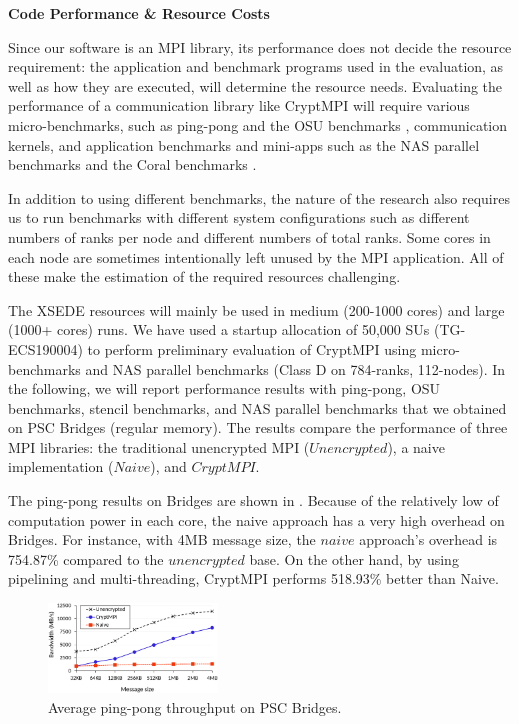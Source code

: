 \centerline{\Large\bfseries Code Performance \& Resource Costs}

Since our software is an MPI library, its performance does not decide the resource requirement:
the application and benchmark programs used in the evaluation, as well as how they are executed,
will determine the resource needs. Evaluating the performance of a communication library like
CryptMPI will require various micro-benchmarks, such as ping-pong and the OSU benchmarks \cite{OSUBM},
communication kernels, and application benchmarks and mini-apps such as the NAS parallel benchmarks
\cite{Bailey:1991:NPB:2748645.2748648} and the Coral benchmarks \cite{CORAL}. 

In addition to using different benchmarks, the nature of the research also requires us to
run benchmarks with different system configurations such as different numbers of ranks per node
and different numbers of total ranks. Some cores in each node are sometimes intentionally left
unused by the MPI application. All of these make the estimation of the required resources
challenging.

The XSEDE resources will mainly be used in medium (200-1000 cores) and large
(1000+ cores) runs. We have used a startup allocation of 50,000 SUs (TG-ECS190004) to perform
preliminary evaluation of CryptMPI using micro-benchmarks and
NAS parallel benchmarks (Class D on 784-ranks, 112-nodes). 
In the following, we will report performance results with ping-pong, OSU benchmarks, stencil
benchmarks, and NAS parallel benchmarks that we obtained on
PSC Bridges (regular memory). The results compare the performance of
three MPI libraries: the traditional unencrypted
MPI ($Unencrypted$), a naive implementation ($Naive$), and $CryptMPI$. 

The ping-pong results on Bridges are shown in . Because of
the relatively low of computation power in each core,
the naive approach has a very high overhead on Bridges.
For instance, with 4MB message size,
the $naive$ approach's overhead is 754.87\% compared to the $unencrypted$
base. On the other hand, by using pipelining and multi-threading, CryptMPI performs
518.93\% better than Naive.

\begin{figure}[htb]
	\centering
		\includegraphics[width=0.4\textwidth]{graphs/infini-xsede-pingpong.eps}
	\caption{Average %
	ping-pong throughput on PSC Bridges.}
	\label{fig:xsede_pingpong}
	\vspace{-2ex}
\end{figure}

